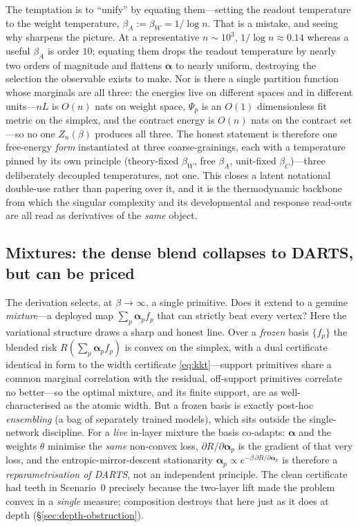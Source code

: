 \documentclass[11pt]{article}
\theoremstyle{definition}
\newcommand{\alphapar}{\bm{\alpha}}
\begin{document}
The temptation is to ``unify'' by equating them---setting the readout temperature to the weight
temperature, $\beta_A:=\beta_W=1/\log n$. That is a mistake, and seeing why sharpens the picture. At a
representative $n\sim10^3$, $1/\log n\approx0.14$ whereas a useful $\beta_A$ is order $10$; equating them
drops the readout temperature by nearly two orders of magnitude and flattens $\alphapar$ to nearly uniform,
destroying the selection the observable exists to make. Nor is there a single partition function whose
marginals are all three: the energies live on different spaces and in different units---$nL$ is $O(n)$ nats
on weight space, $\Psi_p$ is an $O(1)$ dimensionless fit metric on the simplex, and the contract energy is
$O(n)$ nats on the contract set---so no one $Z_n(\beta)$ produces all three. The honest statement is
therefore one free-energy \emph{form} instantiated at three coarse-grainings, each with a temperature pinned
by its own principle (theory-fixed $\beta_W$, free $\beta_A$, unit-fixed $\beta_C$)---three deliberately
decoupled temperatures, not one. This closes a latent notational double-use rather than papering over it,
and it is the thermodynamic backbone from which the singular complexity and its developmental and response
read-outs are all read as derivatives of the \emph{same} object.


\subsection{Mixtures: the dense blend collapses to DARTS, but can be priced}
\label{sec:mixture-priced}

The derivation selects, at $\beta\to\infty$, a single primitive. Does it extend to a genuine
\emph{mixture}---a deployed map $\sum_p\alphapar_p f_p$ that can strictly beat every vertex? Here the
variational structure draws a sharp and honest line. Over a \emph{frozen} basis $\{f_p\}$ the blended risk
$R(\sum_p\alphapar_p f_p)$ is convex on the simplex, with a dual certificate identical in form to the
width certificate \eqref{eq:kkt}---support primitives share a common marginal correlation with the
residual, off-support primitives correlate no better---so the optimal mixture, and its finite support,
are as well-characterised as the atomic width. But a frozen basis is exactly post-hoc \emph{ensembling}
(a bag of separately trained models), which sits outside the single-network discipline. For a
\emph{live} in-layer mixture the basis co-adapts: $\alphapar$ and the weights $\theta$ minimise the
\emph{same} non-convex loss, $\partial R/\partial\alphapar_p$ is the gradient of that very loss, and the
entropic-mirror-descent stationarity $\alphapar_p\propto e^{-\beta\,\partial R/\partial\alphapar_p}$ is
therefore a \emph{reparametrisation of DARTS}, not an independent principle. The clean certificate had
teeth in Scenario~0 precisely because the two-layer lift made the problem convex in a \emph{single}
measure; composition destroys that here just as it does at depth (\S\ref{sec:depth-obstruction}).
\end{document}
